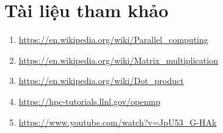 \newpage
\section*{Tài liệu tham khảo}
 {}

\begin{enumerate}[label=(\arabic*)]
 \item \url{https://en.wikipedia.org/wiki/Parallel_computing}
 \item \url{https://en.wikipedia.org/wiki/Matrix_multiplication}
 \item \url{https://en.wikipedia.org/wiki/Dot_product}
 \item \url{https://hpc-tutorials.llnl.gov/openmp}
 \item \url{https://www.youtube.com/watch?v=JpU53_G-HAk}
 
\end{enumerate}